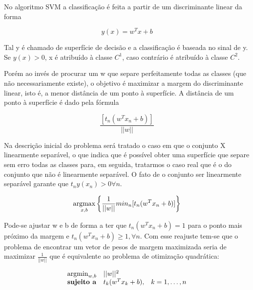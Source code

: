 No algoritmo SVM a classificação é feita a partir de um discriminante linear
da forma 

\begin{center}
	\begin{equation}\label{eq:svm-discriminant}
		y(x) = w^Tx + b
	\end{equation}
\end{center}

Tal y é chamado de superfície de decisão e a classificação é baseada no sinal de
y. Se $y(x) > 0$, x é atribuído à classe $C^1$, caso contrário é atribuído à classe
$C^2$.

Porém ao invés de procurar um w que separe perfeitamente todas as classes (que
não necessariamente existe), o objetivo é maximizar a margem do discriminante
linear, isto é, a menor distância de um ponto à superfície. A distância de um ponto à
superfície é dado pela fórmula

\begin{center}
	\begin{equation}
		\frac{[t_n(w^Tx_n + b)]}{||w||}
	\end{equation}
\end{center}
 
Na descrição inicial do problema será tratado o caso em que o conjunto X linearmente separável, 
o que indica que é possível obter uma superfície que separe sem erro todas as classes para, em
seguida, tratarmos o caso real que é o do conjunto que não é linearmente separável.
O fato de o conjunto ser linearmente separável garante que $t_ny(x_n) >0 \forall n$.


\begin{center}
	\begin{equation}
		\operatorname*{argmax}_{x, b} \left\{ \frac{1}{||w||} min_n [t_n(w^Tx_n + b)] \right\}
	\end{equation}
\end{center}


Pode-se ajustar w e b de forma a ter que $t_n(w^Tx_n + b) = 1$ para o ponto mais
próximo da margem e $t_n(w^Tx_n + b) \ge 1, \forall n$. Com esse reajuste tem-se que o
problema de encontrar um vetor de pesos de margem maximizada seria de maximizar 
$\frac{1}{||w||}$ que é equivalente ao problema de otimização quadrática:

\begin{center}
	\begin{equation}
		\begin{array}{ll@{}ll}
				\argmin_{w, b} & ||w||^2 &\\
				\textbf{sujeito a}& t_k(w^Tx_k + b), &&k = 1, \ldots ,n 
		\end{array}
	\end{equation}
\end{center}

